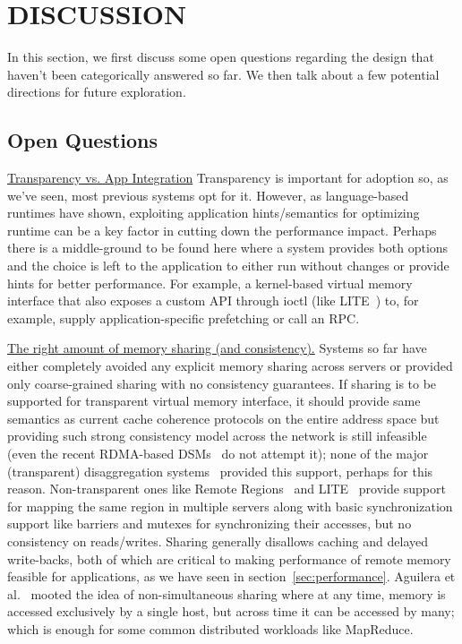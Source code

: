 \section{DISCUSSION}
\label{sec:discussion}
In this section, we first discuss some open questions regarding 
the design that haven't been categorically answered so far. 
We then talk about a few potential directions for future 
exploration.

\subsection{Open Questions}
\vspace{3pt}
\noindent \uline{Transparency vs. App Integration}
Transparency is important for adoption so, as we've seen, 
most previous systems opt for it. However, as 
language-based runtimes have shown, exploiting 
application hints/semantics for optimizing runtime can be
a key factor in cutting down the performance impact.
Perhaps there is a middle-ground to be found here 
where a system provides both options and the choice is left
to the application to either run without changes or 
provide hints for better performance. For example, 
a kernel-based virtual memory interface that also exposes 
a custom API through 
ioctl (like LITE~\cite{literdma}) to, for example, supply 
application-specific prefetching or call an RPC.

\vspace{3pt}
\noindent \uline{The right amount of memory sharing (and consistency).}
Systems so far have either completely avoided any explicit 
memory sharing across servers or provided only coarse-grained 
sharing with no consistency guarantees. 
If sharing is to be supported for transparent virtual 
memory interface, it should provide same semantics as current 
cache coherence protocols on the entire address space but 
providing such strong consistency model across the network 
is still infeasible (even the recent RDMA-based DSMs~\cite{farm,gam} 
do not attempt it); none of the major (transparent) 
disaggregation systems~\cite{infiniswap,legoos} provided this 
support, perhaps for this reason. Non-transparent ones like 
Remote Regions~\cite{remregions} and LITE~\cite{literdma} provide
support for mapping the same region in multiple servers along with
basic synchronization support like barriers and mutexes for 
synchronizing their accesses, but no consistency on reads/writes. 
Sharing generally disallows caching and delayed write-backs,
both of which are critical to making performance of remote memory 
feasible for applications, as we have seen in 
section~\ref{sec:performance}. Aguilera et al.~\cite{Aguilera2017}
mooted the idea of non-simultaneous sharing where at any time, 
memory is accessed exclusively by a single host, but across 
time it can be accessed by many; which is enough for some common 
distributed workloads like MapReduce.


